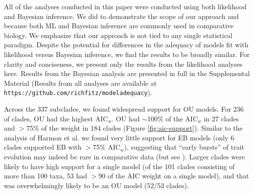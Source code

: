 \documentclass[a4paper,12pt]{article}
\begin{document}
All of the analyses conducted in this paper were conducted using both likelihood and Bayesian inference. We did to demonstrate the scope of our approach and because both ML and Bayesian inference are commonly used in comparative biology. We emphasize that our approach is not tied to any single statistical paradigm.
Despite the potential for differences in the adequacy of models fit with likelihood versus Bayesian inference, we find the results to be broadly similar. For clarity and conciseness, we present only the results from the likelihood analyses here. Results from the Bayesian analysis are presented in full in the Supplemental Material (Results from all analyses are available at \texttt{https://github.com/richfitz/modeladequacy}). 

Across the 337 subclades, we found widespread support for OU
models. For 236 of clades, OU had the highest AIC$_w$.
OU had $\sim$100\% of the AIC$_w$ in 27 clades and $>$75\% of the weight in 184 clades (Figure \ref{fig:aic-support}). Similar to the analysis of Harmon et al. \citep{Harmon2010} we found very little support for EB models (only 6 clades supported EB with $>$75\% AIC$_w$), suggesting that ``early bursts'' of trait evolution may indeed be rare in comparative data (but see \citep{SlaterPennell}). Larger clades were
likely to have high support for a single model (of the 101 clades consisting of more than 100 taxa, 53 had $>$90 of the AIC weight on a single model),
and that was overwhelmingly likely to be an OU model (52/53 clades). 
\end{document}
